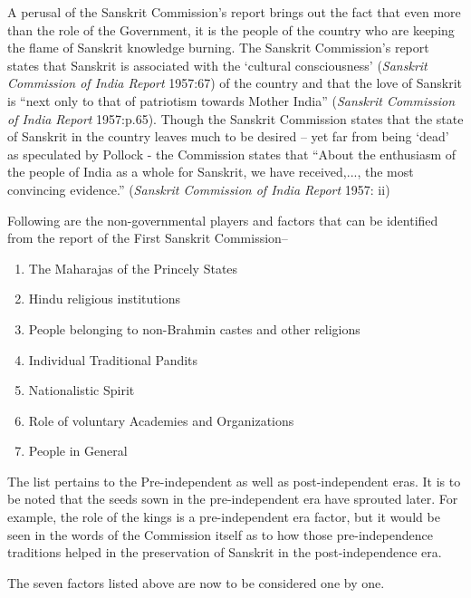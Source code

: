 A perusal of the Sanskrit Commission’s report brings out the fact that even more than the role of the Government, it is the people of the country who are keeping the flame of Sanskrit knowledge burning. The Sanskrit Commission’s report states that Sanskrit is associated with the ‘cultural consciousness’ ({\sl Sanskrit Commission of India Report} 1957:67) of the country and that the love of Sanskrit is “next only to that of patriotism towards Mother India” ({\sl Sanskrit Commission of India Report} 1957:p.65). Though the Sanskrit Commission states that the state of Sanskrit in the country leaves much to be desired – yet far from being ‘dead’ as speculated by Pollock - the Commission states that “About the enthusiasm of the people of India as a whole for Sanskrit, we have received,..., the most convincing evidence.” ({\sl Sanskrit Commission of India Report} 1957: ii)

Following are the non-governmental players and factors that can be identified from the report of the First Sanskrit Commission– 
\renewcommand\theenumi{\alph{enumi}}
\renewcommand\labelenumi{(\theenumi)}
\begin{enumerate}
\itemsep=0pt
\item The Maharajas of the Princely States
\item Hindu religious institutions
\item People belonging to non-Brahmin castes and other religions            
\item Individual Traditional Pandits
\item Nationalistic Spirit
\item Role of voluntary Academies and Organizations
\item People in General 
\end{enumerate}

The list pertains to the Pre-independent as well as post-independent eras. It is to be noted that the seeds sown in the pre-independent era have sprouted later. For example, the role of the kings is a pre-independent era factor, but it would be seen in the words of the Commission itself as to how those pre-independence traditions helped in the preservation of Sanskrit in the post-independence era. 

The seven factors listed above are now to be considered one by one.

